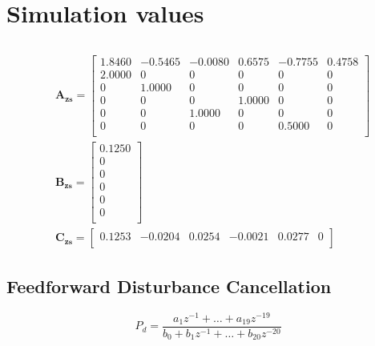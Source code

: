 \chapter{Simulation values}\label{cha:definition}

\section{\abbrRFDC}\label{app:rfdc}
\begin{subequations}
  \label{eq:sysmatrices}
  \begin{alignat}{2}
  & \mathbf{A_{zs}} =
    \begin{bmatrix}
  1.8460 &  -0.5465 &  -0.0080 &   0.6575 &  -0.7755 &   0.4758\\
  2.0000 &        0 &        0 &        0 &        0 &        0\\
       0 &   1.0000 &        0 &        0 &        0 &        0\\
       0 &        0 &        0 &   1.0000 &        0 &        0\\
       0 &        0 &   1.0000 &        0 &        0 &        0\\
       0 &        0 &        0 &        0 &   0.5000 &        0\\
    \end{bmatrix}\\
  & \mathbf{B_{zs}} =
  \begin{bmatrix}
    0.1250\\
         0\\
         0\\
         0\\
         0\\
         0\\
  \end{bmatrix} \\
  & \mathbf{C_{zs}} =
  \begin{bmatrix}
      0.1253  & -0.0204  &  0.0254  & -0.0021  &  0.0277     &    0\\
  \end{bmatrix}
  \end{alignat}
\end{subequations}

\newpage
\section{Feedforward Disturbance Cancellation}\label{app:fdc}

\begin{equation}
  P_d = \frac{a_1z^{-1} + \hdots + a_{19}z^{-19}}{b_0 + b_1z^{-1} + \hdots + b_{20}z^{-20}}
\end{equation}

